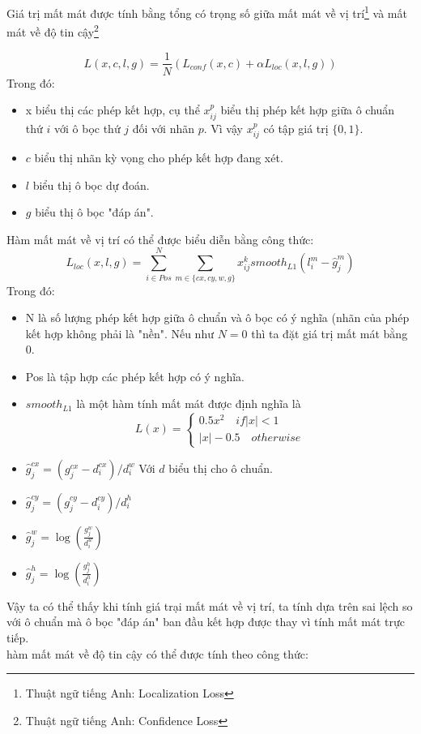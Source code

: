 \documentclass[a4paper,12pt]{article}
\begin{document}
	Giá trị mất mát được tính bằng tổng có trọng số giữa mất mát về vị trí\footnote{Thuật ngữ tiếng Anh: Localization Loss} và mất mát về độ tin cậy\footnote{Thuật ngữ tiếng Anh: Confidence Loss}
	
	$$ L(x,c,l,g) = \frac{1}{N} (L_{conf}(x,c) + \alpha L_{loc}(x,l,g) ) $$
	Trong đó:
	\begin{itemize}
		\item x biểu thị các phép kết hợp, cụ thể $x^p_{ij}$ biểu thị phép kết hợp giữa ô chuẩn thứ $i$ với ô bọc thứ $j$ đối với nhãn $p$. Vì vậy $x^p_{ij}$ có tập giá trị $\{0, 1\}$.
		\item $c$ biểu thị nhãn kỳ vọng cho phép kết hợp đang xét.
		\item $l$ biểu thị ô bọc dự đoán.
		\item $g$ biểu thị ô bọc "đáp án".
	\end{itemize}
	
	Hàm mất mát về vị trí có thể được biểu diễn bằng công thức:
	$$L_{loc}(x,l,g) = \sum^N_{i \in Pos} \sum_{m \in \{ cx, cy, w, g \}} x^k_{ij} smooth_{L1} (l^m_i - \hat{g}^m_j) $$
	Trong đó:
	\begin{itemize}
		\item N là số lượng phép kết hợp giữa ô chuẩn và ô bọc có ý nghĩa (nhãn của phép kết hợp không phải là "nền". Nếu như $N = 0$ thì ta đặt giá trị mất mát bằng 0.
		\item Pos là tập hợp các phép kết hợp có ý nghĩa.
		\item $smooth_{L1}$ là một hàm tính mất mát được định nghĩa là 
		$$L(x) = \begin{cases} 0.5x^2 \quad if |x| < 1 \\ |x| - 0.5 \quad otherwise \end{cases} $$
		\item $\hat{g}_j^{cx} = (g_j^{cx} - d_i^{cx}) / d^w_i$ Với $d$ biểu thị cho ô chuẩn.
		\item $\hat{g}_j^{cy} = (g_j^{cy} - d_i^{cy}) / d^h_i$
		\item $\hat{g}^w_j = \log \left( \frac{g_j^w}{d_i^w} \right)$
		\item $\hat{g}^h_j = \log \left( \frac{g_j^h}{d_i^h} \right)$
	\end{itemize}
	
	Vậy ta có thể thấy khi tính giá trại mất mát về vị trí, ta tính dựa trên sai lệch so với ô chuẩn mà ô bọc "đáp án" ban đầu kết hợp được thay vì tính mất mát trực tiếp.\\
	
	hàm mất mát về độ tin cậy có thể được tính theo công thức:
	
\end{document}
